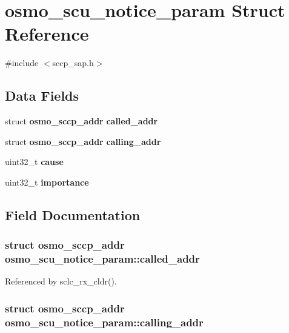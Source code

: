 \section{osmo\+\_\+scu\+\_\+notice\+\_\+param Struct Reference}
\label{structosmo__scu__notice__param}


{\ttfamily \#include $<$sccp\+\_\+sap.\+h$>$}

\subsection*{Data Fields}
\begin{DoxyCompactItemize}
\item 
struct {\bf osmo\+\_\+sccp\+\_\+addr} {\bf called\+\_\+addr}
\item 
struct {\bf osmo\+\_\+sccp\+\_\+addr} {\bf calling\+\_\+addr}
\item 
uint32\+\_\+t {\bf cause}
\item 
uint32\+\_\+t {\bf importance}
\end{DoxyCompactItemize}


\subsection{Field Documentation}
\subsubsection[{called\+\_\+addr}]{\setlength{\rightskip}{0pt plus 5cm}struct {\bf osmo\+\_\+sccp\+\_\+addr} osmo\+\_\+scu\+\_\+notice\+\_\+param\+::called\+\_\+addr}\label{structosmo__scu__notice__param_a0bb9f46ab4edfbbad658da82e993a39f}


Referenced by sclc\+\_\+rx\+\_\+cldr().

\subsubsection[{calling\+\_\+addr}]{\setlength{\rightskip}{0pt plus 5cm}struct {\bf osmo\+\_\+sccp\+\_\+addr} osmo\+\_\+scu\+\_\+notice\+\_\+param\+::calling\+\_\+addr}\label{structosmo__scu__notice__param_a80090a325627f1c6be0a42aeb2e186e6}


